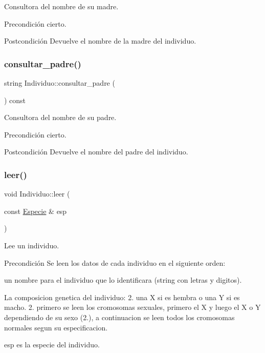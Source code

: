 Consultora del nombre de su madre. 

\begin{DoxyPrecond}{Precondición}
cierto. 
\end{DoxyPrecond}
\begin{DoxyPostcond}{Postcondición}
Devuelve el nombre de la madre del individuo. 
\end{DoxyPostcond}
\mbox{\label{class_individuo_aa31ffa85aa6631315fc08dee6ef1845a}} 
\subsubsection{\texorpdfstring{consultar\+\_\+padre()}{consultar\_padre()}}
{\footnotesize\ttfamily string Individuo\+::consultar\+\_\+padre (\begin{DoxyParamCaption}{ }\end{DoxyParamCaption}) const}



Consultora del nombre de su padre. 

\begin{DoxyPrecond}{Precondición}
cierto. 
\end{DoxyPrecond}
\begin{DoxyPostcond}{Postcondición}
Devuelve el nombre del padre del individuo. 
\end{DoxyPostcond}
\mbox{\label{class_individuo_aca2828dea808d8a09b6bc22719dca574}} 
\subsubsection{\texorpdfstring{leer()}{leer()}}
{\footnotesize\ttfamily void Individuo\+::leer (\begin{DoxyParamCaption}\item[{const \hyperlink{class_especie}{Especie} \&}]{esp }\end{DoxyParamCaption})}



Lee un individuo. 

\begin{DoxyPrecond}{Precondición}
Se leen los datos de cada individuo en el siguiente orden\+:
\begin{DoxyEnumerate}
\item un nombre para el individuo que lo identificara (string con letras y digitos).
\item La composicion genetica del individuo\+: 2. una \textquotesingle{}X\textquotesingle{} si es hembra o una \textquotesingle{}Y\textquotesingle{} si es macho. 2. primero se leen los cromosomas sexuales, primero el X y luego el X o Y dependiendo de su sexo (2.), a continuacion se leen todos los cromosomas normales segun su especificacion.
\end{DoxyEnumerate}
\end{DoxyPrecond}
esp es la especie del individuo.


